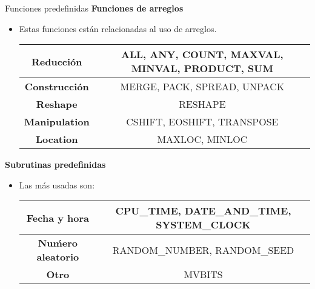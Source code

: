 \begin{frame}[fragile]{Funciones predefinidas}
 \textbf{Funciones de arreglos}
 \begin{itemize}[<+(1)->]
  \item Estas funciones están relacionadas al uso de arreglos.
   \vspace{0.1cm}
   \begin{table}[]
    \centering
    \label{Tabla_funciones_transfyconvers}
    \resizebox{9cm}{!} {
      \begin{tabular}{|c|c|}
        \hline
        \textbf{Reducción}    & ALL, ANY, COUNT, MAXVAL, MINVAL, PRODUCT, SUM \\ \hline       
        \textbf{Construcción} & MERGE, PACK, SPREAD, UNPACK                   \\ \hline                  
        \textbf{Reshape}      & RESHAPE                                       \\ \hline
        \textbf{Manipulation} & CSHIFT, EOSHIFT, TRANSPOSE                    \\ \hline
        \textbf{Location}     & MAXLOC, MINLOC                                \\ \hline
      \end{tabular}}
    \end{table}
  \end{itemize}
 \textbf{Subrutinas predefinidas}
\begin{itemize}[<+(2)->]
  \item Las más usadas son:
   \vspace{0.1cm}
   \begin{table}[]
    \centering
    \label{Tabla_funciones_transfyconvers}
    \resizebox{9cm}{!} {
      \begin{tabular}{|c|c|}
        \hline
        \textbf{Fecha y hora}     & CPU\_TIME, DATE\_AND\_TIME, SYSTEM\_CLOCK \\ \hline
        \textbf{Nuḿero aleatorio} & RANDOM\_NUMBER, RANDOM\_SEED              \\ \hline 
        \textbf{Otro}             & MVBITS                                    \\ \hline
      \end{tabular}}
    \end{table}
  \end{itemize}
\end{frame}